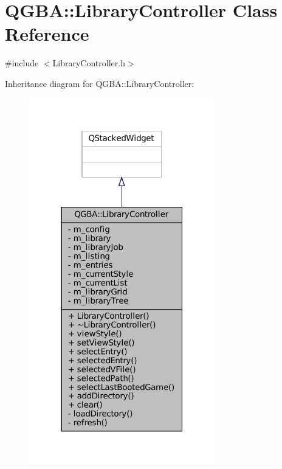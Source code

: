\hypertarget{class_q_g_b_a_1_1_library_controller}{}\section{Q\+G\+BA\+:\+:Library\+Controller Class Reference}
\label{class_q_g_b_a_1_1_library_controller}


{\ttfamily \#include $<$Library\+Controller.\+h$>$}



Inheritance diagram for Q\+G\+BA\+:\+:Library\+Controller\+:
\nopagebreak
\begin{figure}[H]
\begin{center}
\leavevmode
\includegraphics[width=229pt]{class_q_g_b_a_1_1_library_controller__inherit__graph}
\end{center}
\end{figure}


